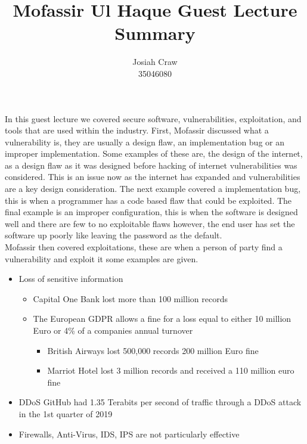 \documentclass{article}
\title{Mofassir Ul Haque Guest Lecture Summary}
\author{Josiah Craw\\35046080}
\begin{document}
\maketitle{}

In this guest lecture we covered secure software, vulnerabilities, exploitation, and tools that 
are used within the industry. First, Mofassir discussed what a vulnerability is, they are usually
a design flaw, an implementation bug or an improper implementation. Some examples of these are,
the design of the internet, as a design flaw as it was designed before hacking of internet
vulnerabilities was considered. This is an issue now as the internet has expanded and
vulnerabilities are a key design consideration. The next example covered a implementation bug,
this is when a programmer has a code based flaw that could be exploited. The final example is an
improper configuration, this is when the software is designed well and there are few to no
exploitable flaws however, the end user has set the software up poorly like leaving the password
as the default.\\

Mofassir then covered exploitations, these are when a person of party find a vulnerability and
exploit it some examples are given.

\begin{itemize}
    
    \item{Loss of sensitive information}

        \begin{itemize}
            
            \item{Capital One Bank lost more than 100 million records}

            \item{The European GDPR allows a fine for a loss equal to either 10 million Euro or
                4\% of a companies annual turnover}
                \begin{itemize}
                    
                    \item{British Airways lost 500,000 records 200 million Euro fine}
                        
                    \item{Marriot Hotel lost 3 million records and received a 110 million euro
                        fine}

                \end{itemize}
        
        \end{itemize}
        
        \item{DDoS GitHub had 1.35 Terabits per second of traffic through a DDoS attack in the 1st
            quarter of 2019}

        \item{Firewalls, Anti-Virus, IDS, IPS are not particularly effective}

\end{itemize}
\end{document}
